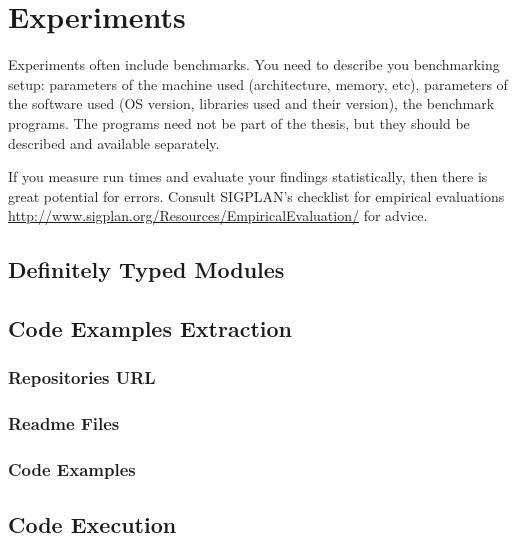 \chapter{Experiments}\label{chap:experiments}

Experiments often include benchmarks.
You need to describe you benchmarking setup: parameters of the machine used (architecture, memory, etc), parameters of the software used (OS version, libraries used and their version), the benchmark programs.
The programs need not be part of the thesis, but they should be described and available separately.

If you measure run times and evaluate your findings statistically, then there is great potential for errors.
Consult SIGPLAN's checklist for empirical evaluations \url{http://www.sigplan.org/Resources/EmpiricalEvaluation/} for advice. 




\section{Definitely Typed Modules}




\section{Code Examples Extraction}
\subsection{Repositories URL}
\subsection{Readme Files}
\subsection{Code Examples}

\section{Code Execution}

